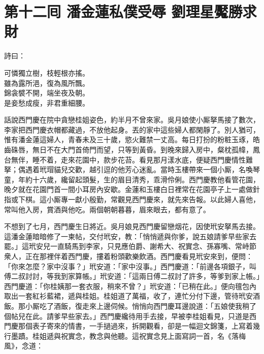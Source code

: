 
\chapter*{第十二囘 潘金蓮私僕受辱 劉理星魘勝求財}


詩曰：

\begin{myquote}
可憐獨立樹，枝輕根亦搖。\\雖為露所浥，復為風所飄。\\錦衾襞不開，端坐夜及朝。\\是妾愁成瘦，非君重細腰。
\end{myquote}

話說西門慶在院中貪戀桂姐姿色，{}約半月不曾來家。吳月娘使小厮拏馬接了數次，李家把西門慶衣帽都藏過，不放他起身。丟的家中這些婦人都閑靜了。別人猶可，惟有潘金蓮這婦人，青春未及三十歲，慾火難禁一丈高。每日打扮的粉粧玉琢，皓齒硃唇，無日不在大門首倚門而望，只等到黃昏。到晚來歸入房中，粲枕孤幃，鳳台無伴，睡不着，走來花園中，款步花苔。看見那月漾水底，便疑西門慶情性難拏；偶遇着玳瑁貓兒交歡，越引逗的他芳心迷亂。當時玉樓帶來一個小厮，名喚琴童，年約十六歲，纔留起頭髮，生的眉目清秀，乖滑伶俐。{}西門慶教他看管花園，晚夕就在花園門首一間小耳房內安歇。金蓮和玉樓白日裡常在花園亭子上一處做針指或下棋。這小厮專一獻小殷勤，{}常觀見西門慶來，就先來告報。以此婦人喜他，常叫他入房，賞酒與他吃。兩個朝朝暮暮，眉來眼去，都有意了。

不想到了七月，西門慶生日將近。吳月娘見西門慶留戀烟花，因使玳安拏馬去接。這潘金蓮暗暗修了一柬帖，交付玳安，教：「悄悄遞與你爹，說五娘請爹早些家去罷。」這玳安兒一直騎馬到李家，只見應伯爵、謝希大、祝實念、孫寡嘴、常峙節衆人，正在那裡伴着西門慶，摟着粉頭歡樂飲酒。西門慶看見玳安來到，便問：「你來怎麼？家中沒事？」玳安道：「家中沒事。」西門慶道：「前邊各項銀子，叫傅二叔討討，等我到家算帳。」{}玳安道：「這兩日傅二叔討了許多，等爹到家上帳。」{}西門慶道：「你桂姨那一套衣服，{}稍來不曾？」玳安道：「已稍在此。」便向氊包內取出一套紅衫藍裙，遞與桂姐。桂姐道了萬福，收了，連忙分付下邊，管待玳安酒飯。那小厮吃了酒飯，復走來上邊伺候。悄悄向西門慶耳邊說道：「五娘使我稍了個帖兒在此。請爹早些家去。」西門慶纔待用手去接，早被李桂姐看見，只道是西門慶那個表子寄來的情書，一手撾過來，拆開觀看，卻是一幅迴文錦箋，上寫着幾行墨蹟。桂姐遞與祝實念，教念與他聽。這祝實念見上面寫詞一首，名《落梅風》，念道：

